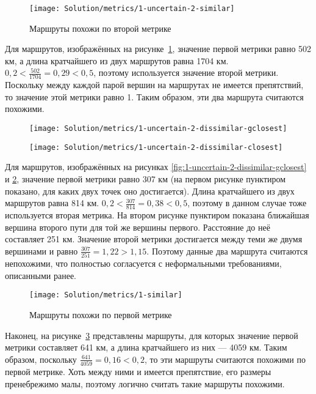 \begin{figure}
    \texttt{[image: Solution/metrics/1-uncertain-2-similar]}
    \caption{Маршруты похожи по второй метрике}
    \label{fig:1-uncertain-2-similar}
\end{figure}

Для маршрутов, изображённых на
рисунке~\ref{fig:1-uncertain-2-similar}, значение первой метрики равно
502 км, а длина кратчайшего из двух маршрутов равна 1704 км. $0,2 <
\frac{502}{1704} = 0,29 < 0,5$, поэтому используется значение второй метрики.
Поскольку между каждой парой вершин на маршрутах не имеется
препятствий, то значение этой метрики равно 1. Таким образом, эти два
маршрута считаются похожими.

\begin{figure}
    \centering
    \begin{minipage}{.5\textwidth}
        \centering
        \texttt{[image: Solution/metrics/1-uncertain-2-dissimilar-gclosest]}
        \label{fig:1-uncertain-2-dissimilar-gclosest}
    \end{minipage}%
    \begin{minipage}{.5\textwidth}
        \centering
        \texttt{[image: Solution/metrics/1-uncertain-2-dissimilar-closest]}
        \label{fig:1-uncertain-2-dissimilar-closest}
    \end{minipage}
\end{figure}

Для маршрутов, изображённых на рисунках
\ref{fig:1-uncertain-2-dissimilar-gclosest} и
\ref{fig:1-uncertain-2-dissimilar-closest}, значение первой метрики
равно 307 км (на первом рисунке пунктиром показано, для каких двух
точек оно достигается). Длина кратчайшего из двух маршрутов равна 814
км. $0,2 < \frac{307}{814} = 0,38 < 0,5$, поэтому в данном случае тоже
используется вторая метрика. На втором рисунке пунктиром показана
ближайшая вершина второго пути для той же вершины первого. Расстояние
до неё составляет 251 км. Значение второй метрики достигается между
теми же двумя вершинами и равно $\frac{307}{251} = 1,22 > 1,15$. Поэтому
данные два маршрута считаются непохожими, что полностью согласуется с
неформальными требованиями, описанными ранее.

\begin{figure}
    \texttt{[image: Solution/metrics/1-similar]}
    \caption{Маршруты похожи по первой метрике}
    \label{fig:1-similar}
\end{figure}

Наконец, на рисунке~\ref{fig:1-similar} представлены маршруты, для
которых значение первой метрики составляет 641 км, а длина кратчайшего
из них --- 4059 км. Таким образом, поскольку $\frac{641}{4059} = 0,16
< 0,2$, то эти маршруты считаются похожими по первой метрике. Хоть
между ними и имеется препятствие, его размеры пренебрежимо малы,
поэтому логично считать такие маршруты похожими.

\FloatBarrier


